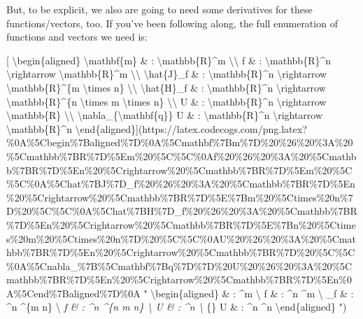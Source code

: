 \documentclass[]{article}
\begin{document}
But, to be explicit, we also are going to need some derivatives for these
functions/vectors, too. If you've been following along, the full enumeration of
functions and vectors we need is:

{[} \textbackslash{}begin\{aligned\} \textbackslash{}mathbf\{m\} \& :
\textbackslash{}mathbb\{R\}\^{}m \textbackslash{}\textbackslash{} f \& :
\textbackslash{}mathbb\{R\}\^{}n \textbackslash{}rightarrow
\textbackslash{}mathbb\{R\}\^{}m \textbackslash{}\textbackslash{}
\textbackslash{}hat\{J\}\_f \& : \textbackslash{}mathbb\{R\}\^{}n
\textbackslash{}rightarrow \textbackslash{}mathbb\{R\}\^{}\{m
\textbackslash{}times n\} \textbackslash{}\textbackslash{}
\textbackslash{}hat\{H\}\_f \& : \textbackslash{}mathbb\{R\}\^{}n
\textbackslash{}rightarrow \textbackslash{}mathbb\{R\}\^{}\{n
\textbackslash{}times m \textbackslash{}times n\}
\textbackslash{}\textbackslash{} U \& : \textbackslash{}mathbb\{R\}\^{}n
\textbackslash{}rightarrow \textbackslash{}mathbb\{R\}
\textbackslash{}\textbackslash{}
\textbackslash{}nabla\_\{\textbackslash{}mathbf\{q\}\} U \& :
\textbackslash{}mathbb\{R\}\^{}n \textbackslash{}rightarrow
\textbackslash{}mathbb\{R\}\^{}n
\textbackslash{}end\{aligned\}{]}(https://latex.codecogs.com/png.latex?\%0A\%5Cbegin\%7Baligned\%7D\%0A\%5Cmathbf\%7Bm\%7D\%20\%26\%20\%3A\%20\%5Cmathbb\%7BR\%7D\%5Em\%20\%5C\%5C\%0Af\%20\%26\%20\%3A\%20\%5Cmathbb\%7BR\%7D\%5En\%20\%5Crightarrow\%20\%5Cmathbb\%7BR\%7D\%5Em\%20\%5C\%5C\%0A\%5Chat\%7BJ\%7D\_f\%20\%26\%20\%3A\%20\%5Cmathbb\%7BR\%7D\%5En\%20\%5Crightarrow\%20\%5Cmathbb\%7BR\%7D\%5E\%7Bm\%20\%5Ctimes\%20n\%7D\%20\%5C\%5C\%0A\%5Chat\%7BH\%7D\_f\%20\%26\%20\%3A\%20\%5Cmathbb\%7BR\%7D\%5En\%20\%5Crightarrow\%20\%5Cmathbb\%7BR\%7D\%5E\%7Bn\%20\%5Ctimes\%20m\%20\%5Ctimes\%20n\%7D\%20\%5C\%5C\%0AU\%20\%26\%20\%3A\%20\%5Cmathbb\%7BR\%7D\%5En\%20\%5Crightarrow\%20\%5Cmathbb\%7BR\%7D\%20\%5C\%5C\%0A\%5Cnabla\_\%7B\%5Cmathbf\%7Bq\%7D\%7D\%20U\%20\%26\%20\%3A\%20\%5Cmathbb\%7BR\%7D\%5En\%20\%5Crightarrow\%20\%5Cmathbb\%7BR\%7D\%5En\%0A\%5Cend\%7Baligned\%7D\%0A
" \textbackslash{}begin\{aligned\}  \& : \^{}m
\textbackslash{} f \& : \^{}n \rightarrow {}\^{}m
\textbackslash{} \_f \& : \^{}n \rightarrow {}\^{}\{m
\times n\} \textbackslash{} \emph{f \& : \^{}n
\rightarrow {}\^{}\{n \times m \times n\} \textbackslash{} U \& :
\^{}n \rightarrow {} \textbackslash{} \nabla}\{\} U
\& : \^{}n \rightarrow {}\^{}n \textbackslash{}end\{aligned\}
")
\end{document}
